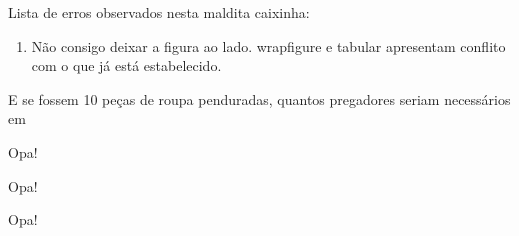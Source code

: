 \documentclass[a4,12pt]{book}
\begin{document}
\begin{refletindo}
Lista de erros observados nesta maldita caixinha:

\begin{enumerate}
 \item Não consigo deixar a figura ao lado. wrapfigure e tabular apresentam conflito com o que já está estabelecido.
\end{enumerate}
\end{refletindo}

E se fossem 10 peças de roupa penduradas, quantos pregadores seriam necessários em

\lipsum[1]

\begin{refletindo}
 Opa!
 \lipsum[1]
\end{refletindo}

\lipsum[2-4]

\begin{refletindo}
 Opa!
 \lipsum[5]
\end{refletindo}

\lipsum
\begin{refletindo}
 Opa!
 \lipsum[1]
\end{refletindo}

\lipsum[2-4]




\end{document}
